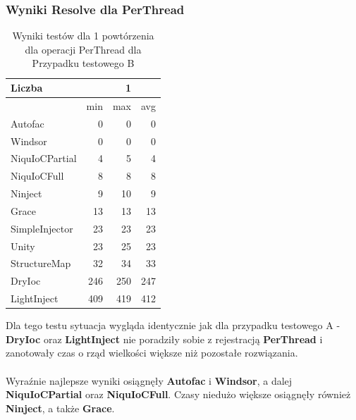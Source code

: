 \documentclass[12pt]{article}
\begin{document}
\subsubsection{Wyniki Resolve dla PerThread}
\begin{table}[H]
\captionsetup{belowskip=0pt,aboveskip=0pt}
\begin{center}
\begin{small}
	\begin{tabular}{ | l | r r r | }
    		\hline
Liczba & & 1 & \\ \hline
 & min & max & avg \\ \hline
Autofac & 0 & 0 & 0 \\ \hline
Windsor & 0 & 0 & 0 \\ \hline
NiquIoCPartial & 4 & 5 & 4 \\ \hline
NiquIoCFull & 8 & 8 & 8 \\ \hline
Ninject & 9 & 10 & 9 \\ \hline
Grace & 13 & 13 & 13 \\ \hline
SimpleInjector & 23 & 23 & 23 \\ \hline
Unity & 23 & 25 & 23 \\ \hline
StructureMap & 32 & 34 & 33 \\ \hline
DryIoc & 246 & 250 & 247 \\ \hline
LightInject & 409 & 419 & 412 \\ \hline
  	\end{tabular}
\end{small}
\end{center}
\caption{Wyniki testów dla 1 powtórzenia dla operacji PerThread dla Przypadku testowego B}
\label{TestCaseB_PerThread1}
\end{table}
Dla tego testu sytuacja wygląda identycznie jak dla przypadku testowego A - \textbf{DryIoc} oraz \textbf{LightInject} nie poradziły sobie z rejestracją \textbf{PerThread} i zanotowały czas o rząd wielkości większe niż pozostałe rozwiązania.\\
\\
Wyraźnie najlepsze wyniki osiągnęły \textbf{Autofac} i \textbf{Windsor}, a dalej \textbf{NiquIoCPartial} oraz \textbf{NiquIoCFull}. Czasy niedużo większe osiągnęły również \textbf{Ninject}, a także \textbf{Grace}.
\\ \\
\end{document}
